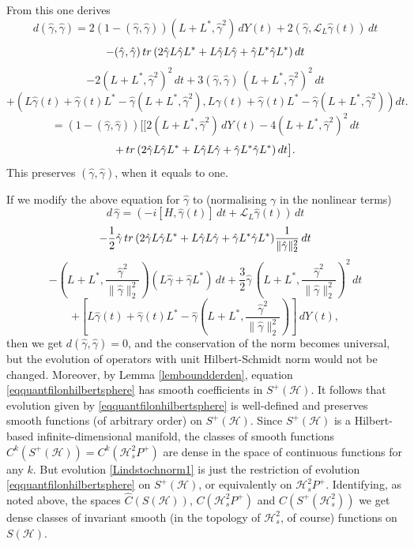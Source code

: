 \documentclass[10pt,a4paper]{amsart}
\def\LC{\mathcal{L}}
\def\HC{\mathcal{H}}
\def\tr{\rm{tr}}
\def\ga{\gamma}
\begin{document}
From this one derives
\[
d(\hat \ga, \hat \ga)=2(1-(\hat \ga, \hat \ga)) (L+L^*, \hat \ga^2)\, dY(t)
+2( \hat \ga , \LC_L \hat \ga(t)) \, dt
\]
\[
-(\hat \ga, \hat \ga) \, {\tr} \,(2\hat \ga L\hat \ga L^*+ L \hat \ga L \hat \ga + \hat \ga L^* \hat \ga L^*) \, dt
\]
\[
-2(L+L^*, \hat \ga^2)^2 \, dt +3 (\hat \ga, \hat \ga) \, (L+L^*, \hat \ga^2) ^2 \, dt
\]
\[
+ (L\hat \ga(t)+\hat \ga(t) L^* -\hat \ga (L+L^*, \hat \ga^2),L\hat \ga(t)+\hat \ga(t) L^* -\hat \ga (L+L^*, \hat \ga^2)) dt.
\]
\[
=(1-(\hat \ga, \hat \ga))\bigl[[2 (L+L^*, \hat \ga^2)\, dY(t)-4  (L+L^*, \hat \ga^2)^2\, dt
\]
\[
+ \, {\tr} \,(2\hat \ga L\hat \ga L^*+ L \hat \ga L \hat \ga + \hat \ga L^* \hat \ga L^*) \, dt\bigr].
\]
This preserves $(\hat \ga, \hat \ga)$, when it equals to one.

If we modify the above equation for $\hat \ga $ to (normalising $\ga$ in the nonlinear terms)
 \[
d \, \hat  \ga=(-i[H,\hat \ga(t)] \, dt +\LC_L \hat \ga(t)) \, dt
\]
\[
-\frac12 \hat \ga \, {\tr} \,(2\hat \ga L\hat \ga L^*+ L \hat \ga L \hat \ga + \hat \ga L^* \hat \ga L^*)
 \frac{1}{\|\hat \ga\|^2_2}\, dt
\]
\[
-\left(L+L^*, \frac{\hat \ga^2}{{\|\hat \ga\|^2_2}}\right) (L\hat \ga +\hat \ga L^*) \, dt
+\frac32 \hat \ga \, \left(L+L^*, \frac{\hat \ga^2}{{\|\hat \ga\|^2_2}}\right) ^2 \, dt
\]
\begin{equation}
\label{eqquantfilonhilbertsphere}
+\left[L\hat \ga(t)+\hat \ga(t) L^* -\hat \ga \left(L+L^*, \frac{\hat \ga^2}{{\|\hat \ga\|^2_2}}\right)\right]\, dY(t),
\end{equation}
then we get $d(\hat \ga, \hat \ga)=0$,
and the conservation of the norm becomes universal, but the evolution of operators
with unit Hilbert-Schmidt norm would not be changed.
Moreover, by Lemma \ref{lemboundderden},
equation \eqref{eqquantfilonhilbertsphere} has smooth coefficients
in $S^+(\HC)$. It follows that evolution given by \eqref{eqquantfilonhilbertsphere} is well-defined
and preserves smooth functions (of arbitrary order) on $S^+(\HC)$. Since $S^+(\HC)$
is a Hilbert-based infinite-dimensional manifold, the classes of smooth functions
$C^k(S^+(\HC))=C^k(\HC^2_sP^+)$ are dense
in the space of continuous functions for any $k$. But evolution  \eqref{Lindstochnorm1} is just the restriction
of evolution \eqref{eqquantfilonhilbertsphere} on $S^+(\HC)$, or equivalently on $\HC^2_sP^+$.
Identifying, as noted above, the spaces
 $\hat C(S(\HC))$, $C(\HC^2_sP^+)$ and $C(S^+(\HC^2_s))$ we get dense classes of invariant smooth
 (in the topology of $\HC^2_s$, of course) functions on $S(\HC)$.
\end{document}
